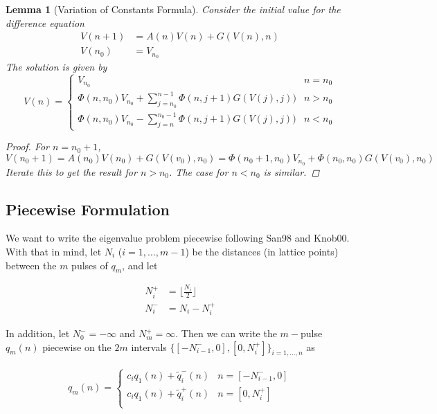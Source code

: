 \documentclass[12pt]{article}
\newtheorem{lemma}{Lemma}
\begin{document}
\begin{lemma}[Variation of Constants Formula]\label{VOC}
Consider the initial value for the difference equation
\begin{align*}
V(n+1) &= A(n) V(n) + G(V(n), n) \\
V(n_0) &= V_{n_0}
\end{align*}
The solution is given by
\begin{equation}\label{VOCformula}
V(n) = 
\begin{cases}
V_{n_0} & n = n_0 \\
\Phi(n, n_0) V_{n_0} + \sum_{j = n_0}^{n-1} \Phi(n, j+1) G(V(j), j)) & n > n_0 \\
\Phi(n, n_0) V_{n_0} - \sum_{j = n}^{n_0-1} \Phi(n, j+1) G(V(j), j)) & n < n_0 

\end{cases}
\end{equation}

\begin{proof}
For $n = n_0 + 1$,
\[
V(n_0 + 1) = A(n_0) V(n_0) + G(V(v_0), n_0) = \Phi(n_0+1, n_0) V_{n_0} + \Phi(n_0, n_0) G(V(v_0), n_0)
\]
Iterate this to get the result for $n > n_0$. The case for $n < n_0$ is similar.
\end{proof}
\end{lemma}

\subsection{Piecewise Formulation}

We want to write the eigenvalue problem piecewise following San98 and Knob00. With that in mind, let $N_i$ ($i = 1, \dots, m-1$) be the distances (in lattice points) between the $m$ pulses of $q_m$, and let

\begin{align*}
N_i^+ &= \lfloor \frac{N_i}{2} \rfloor \\
N_i^- &= N_i - N_i^+
\end{align*}

In addition, let $N_0^- = -\infty$ and $N_m^+ = \infty$. Then we can write the $m-$pulse $q_m(n)$ piecewise on the $2m$ intervals $\{ [-N_{i-1}^-, 0], [0, N_i^+] \}_{i=1, \dots, n}$ as

\begin{align}\label{qmpiecewise}
q_m(n) =
\begin{cases}
c_i q_1(n) + \tilde{q}_i^-(n) & n = [-N_{i-1}^-, 0] \\
c_i q_1(n) + \tilde{q}_i^+(n) & n = [0, N_i^+] \\
\end{cases}
\end{align}
\end{document}
